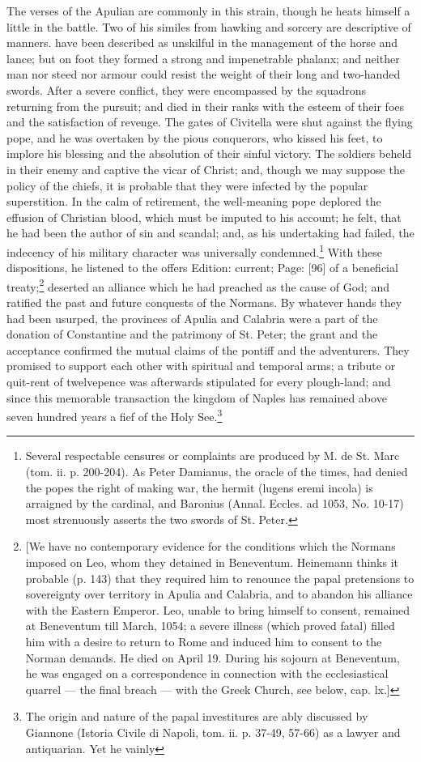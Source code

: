 {The verses of the Apulian are commonly in this strain, though he heats himself a little in the battle. Two of his similes from hawking and sorcery are descriptive of manners.} have been described as unskilful in the management of the horse and lance; but on foot they formed a strong and impenetrable phalanx; and neither man nor steed nor armour could resist the weight of their long and two-handed swords. After a severe conflict, they were encompassed by the squadrons returning from the pursuit; and died in their ranks with the esteem of their foes and the satisfaction of revenge. The gates of Civitella were shut against the flying pope, and he was overtaken by the pious conquerors, who kissed his feet, to implore his blessing and the absolution of their sinful victory. The soldiers beheld in their enemy and captive the vicar of Christ; and, though we may suppose the policy of the chiefs, it is probable that they were infected by the popular superstition. In the calm of retirement, the well-meaning pope deplored the effusion of Christian blood, which must be imputed to his account; he felt, that he had been the author of sin and scandal; and, as his undertaking had failed, the indecency of his military character was universally condemned.\footnote{Several respectable censures or complaints are produced by M. de St. Marc (tom. ii. p. 200-204). As Peter Damianus, the oracle of the times, had denied the popes the right of making war, the hermit (lugens eremi incola) is arraigned by the cardinal, and Baronius (Annal. Eccles. ad 1053, No. 10-17) most strenuously asserts the two swords of St. Peter.} With these dispositions, he listened to the offers Edition: current; Page: [96] of a beneficial treaty;\footnote{[We have no contemporary evidence for the conditions which the Normans imposed on Leo, whom they detained in Beneventum. Heinemann thinks it probable (p. 143) that they required him to renounce the papal pretensions to sovereignty over territory in Apulia and Calabria, and to abandon his alliance with the Eastern Emperor. Leo, unable to bring himself to consent, remained at Beneventum till March, 1054; a severe illness (which proved fatal) filled him with a desire to return to Rome and induced him to consent to the Norman demands. He died on April 19. During his sojourn at Beneventum, he was engaged on a correspondence in connection with the ecclesiastical quarrel \texthebrew{—} the final breach \texthebrew{—} with the Greek Church, see below, cap. lx.]} deserted an alliance which he had preached as the cause of God; and ratified the past and future conquests of the Normans. By whatever hands they had been usurped, the provinces of Apulia and Calabria were a part of the donation of Constantine and the patrimony of St. Peter; the grant and the acceptance confirmed the mutual claims of the pontiff and the adventurers. They promised to support each other with spiritual and temporal arms; a tribute or quit-rent of twelvepence was afterwards stipulated for every plough-land; and since this memorable transaction the kingdom of Naples has remained above seven hundred years a fief of the Holy See.\footnote{The origin and nature of the papal investitures are ably discussed by Giannone (Istoria Civile di Napoli, tom. ii. p. 37-49, 57-66) as a lawyer and antiquarian. Yet he vainly }
